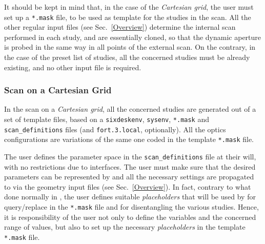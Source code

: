 It should be kept in mind that, in the case of the \emph{Cartesian grid},
the user must set up a \texttt{*.mask} file, to be used as template for
the studies in the scan. All the other regular input files
(see Sec.~\ref{Overview}) determine the
internal scan performed in each study, and are essentially cloned,
so that the dynamic aperture is probed in the same way
in all points of the external scan. On the contrary,
in the case of the preset list of studies, all the concerned
studies must be already existing, and no other input file is
required.

\subsubsection{Scan on a Cartesian Grid}
In the scan on a \emph{Cartesian grid}, all the concerned studies
are generated out of a set of template files, based on a
\texttt{sixdeskenv}, \texttt{sysenv}, \texttt{*.mask} and
\texttt{scan\_definitions} files (and \texttt{fort.3.local}, optionally).
All the optics configurations are variations of the same one coded
in the template \texttt{*.mask} file.

The user defines the parameter space in the \texttt{scan\_definitions}
file at their will, with no restrictions due to interfaces. The user must
make sure that the desired parameters can be represented by \MADX{}
and all the necessary settings are propagated to \SIXTRACK{} via
the geometry input files (see Sec.~\ref{Overview}).
In fact, contrary to what done normally in
\SIXDESK{}, the user defines suitable \emph{placeholders} that will be
used by \SIXDESK{} for query/replace in the \texttt{*.mask} file and
for disentangling the various studies. Hence, it is responsibility of the
user not only to define the variables and the concerned range of values,
but also to set up the necessary \emph{placeholders}
in the template \texttt{*.mask} file.

